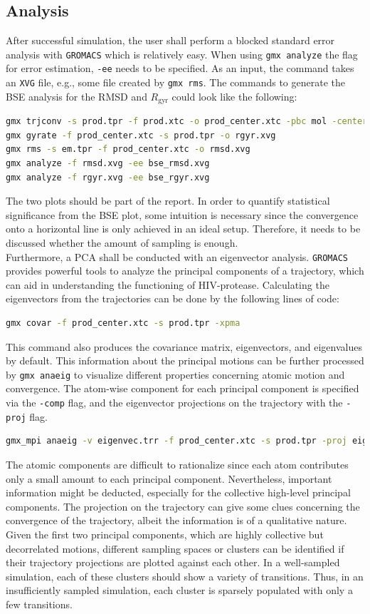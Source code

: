 \documentclass[9pt,tutorial]{livecoms}
\newcommand{\code}[1]{\colorbox{light-gray}{\texttt{#1}}}
\begin{document}
\subsection{Analysis}
After successful simulation, the user shall perform a blocked standard error analysis with \texttt{GROMACS} which is relatively easy. When using \code{gmx analyze} the flag for error estimation, \code{-ee} needs to be specified. As an input, the command takes an \texttt{XVG} file, e.g., some file created by \code{gmx rms}. The commands to generate the BSE analysis for the RMSD and $R_\text{gyr}$ could look like the following:
\begin{lstlisting}[language=bash]
gmx trjconv -s prod.tpr -f prod.xtc -o prod_center.xtc -pbc mol -center
gmx gyrate -f prod_center.xtc -s prod.tpr -o rgyr.xvg
gmx rms -s em.tpr -f prod_center.xtc -o rmsd.xvg
gmx analyze -f rmsd.xvg -ee bse_rmsd.xvg
gmx analyze -f rgyr.xvg -ee bse_rgyr.xvg
\end{lstlisting}
The two plots should be part of the report. In order to quantify statistical significance from the BSE plot, some intuition is necessary since the convergence onto a horizontal line is only achieved in an ideal setup. Therefore, it needs to be discussed whether the amount of sampling is enough.\\
Furthermore, a PCA shall be conducted with an eigenvector analysis. \texttt{GROMACS} provides powerful tools to analyze the principal components of a trajectory, which can aid in understanding the functioning of HIV-protease. Calculating the eigenvectors from the trajectories can be done by the following lines of code:
\begin{lstlisting}[language=bash]
gmx covar -f prod_center.xtc -s prod.tpr -xpma
\end{lstlisting}
This command also produces the covariance matrix, eigenvectors, and eigenvalues by default. This information about the principal motions can be further processed by \code{gmx anaeig} to visualize different properties concerning atomic motion and convergence. The atom-wise component for each principal component is specified via the \code{-comp} flag, and the eigenvector projections on the trajectory with the \code{-proj} flag.
\begin{lstlisting}[language=bash]
gmx_mpi anaeig -v eigenvec.trr -f prod_center.xtc -s prod.tpr -proj eigproj1_10.xvg -comp eigcomp1_10.xvg -last 10 
\end{lstlisting}
The atomic components are difficult to rationalize since each atom contributes only a small amount to each principal component. Nevertheless, important information might be deducted, especially for the collective high-level principal components. The projection on the trajectory can give some clues concerning the convergence of the trajectory, albeit the information is of a qualitative nature. Given the first two principal components, which are highly collective but decorrelated motions, different sampling spaces or clusters can be identified if their trajectory projections are plotted against each other. In a well-sampled simulation, each of these clusters should show a variety of transitions. Thus, in an insufficiently sampled simulation, each cluster is sparsely populated with only a few transitions.\\
\end{document}
